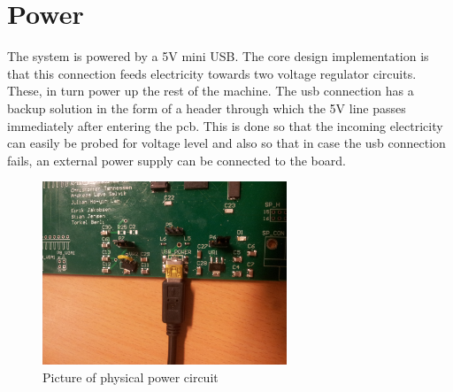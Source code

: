 \documentclass[../main/report.tex]{subfiles}
\begin{document}
\section{Power}

The system is powered by a 5V mini USB.
The core design implementation is that this connection feeds electricity towards two voltage regulator circuits.
These, in turn power up the rest of the machine.
The usb connection has a backup solution in the form of a header through which the 5V line passes immediately after entering the pcb.
This is done so that the incoming electricity can easily be probed for voltage level and also so that in case the usb connection fails, an external power supply can be connected to the board.

\begin{figure}[H]
	\centering
	\includegraphics[width=0.65\textwidth]{../pcb/assets/power.jpg}
	\caption{Picture of physical power circuit}
	\label{fig: power picture}
\end{figure}
\end{document}
